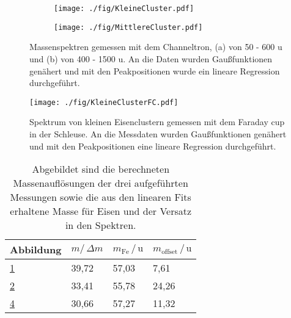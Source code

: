 
\begin{figure}
  \begin{subfigure}[h]{0.9\textwidth}
    \texttt{[image: ./fig/KleineCluster.pdf]}
    \caption{}
    \label{fig:cluster_small}
  \end{subfigure}\hfill
  \begin{subfigure}[t]{1\textwidth}
    \texttt{[image: ./fig/MittlereCluster.pdf]}
    \caption{}
    \label{fig:cluster_medium}
  \end{subfigure}
  \caption{Massenspektren gemessen mit dem Channeltron, (a) von 50 - 600 u und (b) von 400 - 1500 u. An die Daten wurden Gaußfunktionen genähert und mit den Peakpositionen wurde ein lineare Regression durchgeführt.}
  \label{fig:cluster_chtr}
\end{figure}

\begin{figure}
  \centering
  \texttt{[image: ./fig/KleineClusterFC.pdf]}
  \caption{Spektrum von kleinen Eisenclustern gemessen mit dem Faraday cup in der Schleuse. An die Messdaten wurden Gaußfunktionen genähert und mit den Peakpositionen eine lineare Regression durchgeführt.}
  \label{fig:cluster_fc}
\end{figure}

\begin{table}
  \centering
  \caption{Abgebildet sind die berechneten Massenauflösungen der drei aufgeführten Messungen sowie die aus den linearen Fits erhaltene Masse für Eisen und der Versatz in den Spektren.}
  \label{tab:msfitdata}
  \begin{tabular}{llll}
      \toprule
      Abbildung	&	$m/\,\Delta m $	&	$m_\text{Fe}\,/\,\text{u}$	&	$m_\text{offset}\,/\,\text{u}$	\\
      \midrule
      \ref{fig:cluster_small}	&	39,72	&	57,03	&	7,61	\\
      \ref{fig:cluster_medium}	&	33,41	&	55,78	&	24,26	\\
      \ref{fig:cluster_fc}	&	30,66	&	57,27	&	11,32	\\
      \bottomrule
  \end{tabular}
\end{table}

